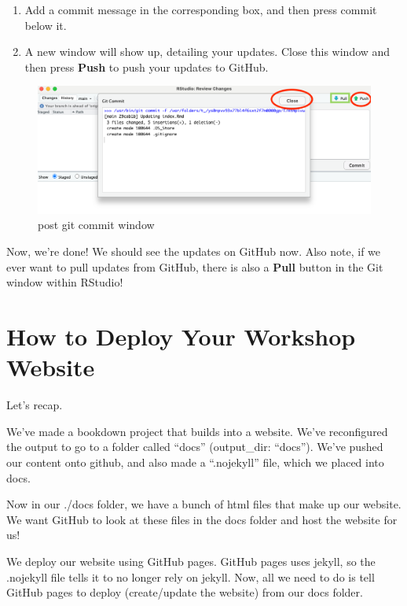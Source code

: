 \documentclass[
]{book}
\theoremstyle{definition}
\theoremstyle{definition}
\theoremstyle{definition}
\theoremstyle{definition}
\theoremstyle{remark}
\begin{document}
\begin{enumerate}
\def\labelenumi{\arabic{enumi}.}
\setcounter{enumi}{14}
\item
  Add a commit message in the corresponding box, and then press commit below it.
\item
  A new window will show up, detailing your updates. Close this window and then press \textbf{Push} to push your updates to GitHub.
\end{enumerate}

\begin{figure}
\centering
\includegraphics{img/git-instruct/git-window-post-commit.png}
\caption{post git commit window}
\end{figure}

Now, we're done! We should see the updates on GitHub now. Also note, if we ever want to pull updates from GitHub, there is also a \textbf{Pull} button in the Git window within RStudio!

\chapter{How to Deploy Your Workshop Website}\label{how-to-deploy-your-workshop-website-1}

Let's recap.

We've made a bookdown project that builds into a website. We've reconfigured the output to go to a folder called ``docs'' (output\_dir: ``docs''). We've pushed our content onto github, and also made a ``.nojekyll'' file, which we placed into docs.

Now in our ./docs folder, we have a bunch of html files that make up our website. We want GitHub to look at these files in the docs folder and host the website for us!

We deploy our website using GitHub pages. GitHub pages uses jekyll, so the .nojekyll file tells it to no longer rely on jekyll. Now, all we need to do is tell GitHub pages to deploy (create/update the website) from our docs folder.
\end{document}
